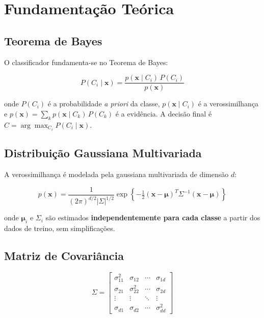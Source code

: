 \documentclass[12pt, a4paper]{article}
\begin{document}
\section{Fundamentação Teórica}

\subsection{Teorema de Bayes}

O classificador fundamenta-se no Teorema de Bayes:

\begin{equation}
    P(C_i \mid \mathbf{x}) =
    \frac{p(\mathbf{x} \mid C_i)\,P(C_i)}{p(\mathbf{x})}
\end{equation}

\noindent onde $P(C_i)$ é a probabilidade \textit{a priori} da classe,
$p(\mathbf{x} \mid C_i)$ é a verossimilhança e
$p(\mathbf{x}) = \sum_k p(\mathbf{x} \mid C_k)\,P(C_k)$ é a evidência.
A decisão final é $\hat{C} = \arg\max_{C_i} P(C_i \mid \mathbf{x})$.

\subsection{Distribuição Gaussiana Multivariada}

A verossimilhança é modelada pela gaussiana multivariada de dimensão $d$:

\begin{equation}
    p(\mathbf{x}) =
    \frac{1}{(2\pi)^{d/2}|\Sigma|^{1/2}}
    \exp\!\left\{
        -\tfrac{1}{2}(\mathbf{x}-\boldsymbol{\mu})^T
        \Sigma^{-1}(\mathbf{x}-\boldsymbol{\mu})
    \right\}
    \label{eq:gaussiana}
\end{equation}

\noindent onde $\boldsymbol{\mu}_i$ e $\Sigma_i$ são estimados
\textbf{independentemente para cada classe} a partir dos dados de treino,
sem simplificações.

\subsection{Matriz de Covariância}

\begin{equation}
    \Sigma =
    \begin{bmatrix}
        \sigma_{11}^2 & \sigma_{12} & \cdots & \sigma_{1d}\\
        \sigma_{21} & \sigma_{22}^2 & \cdots & \sigma_{2d}\\
        \vdots & \vdots & \ddots & \vdots\\
        \sigma_{d1} & \sigma_{d2} & \cdots & \sigma_{dd}^2
    \end{bmatrix}
\end{equation}
\end{document}
